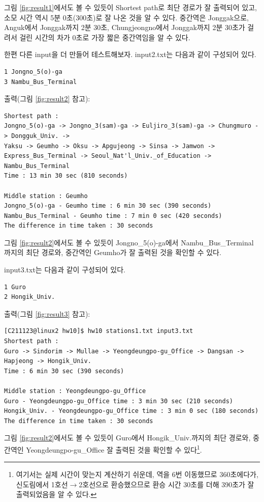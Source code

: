 \documentclass{article}
\begin{document}
그림 \ref{fig:result1}에서도 볼 수 있듯이 Shortest path로 최단 경로가 잘 출력되어 있고, 소모 시간 역시 5분 0초(300초)로 잘 나온 것을 알 수 있다. 중간역은 Jonggak으로, Anguk에서 Jonggak까지 2분 30초, Chungjeongno에서 Jonggak까지 2분 30초가 걸려서 걸린 시간의 차가 0초로 가장 짧은 중간역임을 알 수 있다.

한편 다른 input을 더 만들어 테스트해보자. input2.txt는 다음과 같이 구성되어 있다.
\begin{verbatim}
1 Jongno_5(o)-ga
3 Nambu_Bus_Terminal
\end{verbatim}
출력(그림 \ref{fig:result2} 참고): 
\begin{verbatim}
Shortest path :
Jongno_5(o)-ga -> Jongno_3(sam)-ga -> Euljiro_3(sam)-ga -> Chungmuro -> Dongguk_Univ. ->
Yaksu -> Geumho -> Oksu -> Apgujeong -> Sinsa -> Jamwon ->
Express_Bus_Terminal -> Seoul_Nat'l_Univ._of_Education -> Nambu_Bus_Terminal
Time : 13 min 30 sec (810 seconds)

Middle station : Geumho
Jongno_5(o)-ga - Geumho time : 6 min 30 sec (390 seconds)
Nambu_Bus_Terminal - Geumho time : 7 min 0 sec (420 seconds)
The difference in time taken : 30 seconds
\end{verbatim}

그림 \ref{fig:result2}에서도 볼 수 있듯이 Jongno\_5(o)-ga에서 Nambu\_Bus\_Terminal까지의 최단 경로와, 중간역인 Geumho가 잘 출력된 것을 확인할 수 있다.

input3.txt는 다음과 같이 구성되어 있다.
\begin{verbatim}
1 Guro
2 Hongik_Univ.
\end{verbatim}
출력(그림 \ref{fig:result3} 참고):
\begin{verbatim}
[C211123@linux2 hw10]$ hw10 stations1.txt input3.txt
Shortest path :
Guro -> Sindorim -> Mullae -> Yeongdeungpo-gu_Office -> Dangsan ->
Hapjeong -> Hongik_Univ.
Time : 6 min 30 sec (390 seconds)

Middle station : Yeongdeungpo-gu_Office
Guro - Yeongdeungpo-gu_Office time : 3 min 30 sec (210 seconds)
Hongik_Univ. - Yeongdeungpo-gu_Office time : 3 min 0 sec (180 seconds)
The difference in time taken : 30 seconds
\end{verbatim}

그림 \ref{fig:result2}에서도 볼 수 있듯이 Guro에서 Hongik\_Univ.까지의 최단 경로와, 중간역인 Yeongdeungpo-gu\_Office 잘 출력된 것을 확인할 수 있다\footnote{여기서는 실제 시간이 맞는지 계산하기 쉬운데, 역을 6번 이동했므로 360초에다가, 신도림에서 1호선$\rightarrow$2호선으로 환승했으므로 환승 시간 30초를 더해 390초가 잘 출력되었음을 알 수 있다.}.
\end{document}
